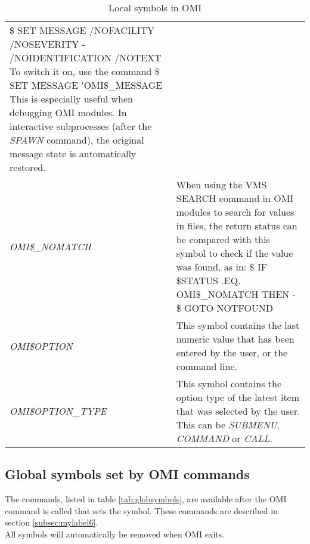 \documentclass[a4paper]{book}
\renewcommand{\indent}{\hspace*{5mm}}
\begin{document}
\begin{table}[ht]
\begin{minipage}[t]{\textwidth}
\begin{tabular}{lp{9cm}}
\indent\small{\textsf{{\$} SET MESSAGE /NOFACILITY /NOSEVERITY -}} \newline
\indent\indent\small{\textsf{/NOIDENTIFICATION /NOTEXT}} \newline
To switch it on, use the command \newline
\indent\small{\textsf{{\$} SET MESSAGE \'{}OMI{\$}{\_}MESSAGE}} \newline
This is especially useful when debugging OMI modules. In interactive subprocesses
(after the \textsl{SPAWN} command), the original message state is
automatically restored. \\
\textsl{OMI{\$}{\_}NOMATCH}\index{OMI{\$}{\_}NOMATCH}\index{OMI symbols!local symbols!OMI{\$}{\_}NOMATCH} & 
When using the VMS SEARCH command in OMI modules to search for 
values in files, the return status can be compared with this 
symbol to check if the value was found, as in: \linebreak
\indent\small{\textsf{{\$} IF {\$}STATUS .EQ. OMI{\$}{\_}NOMATCH THEN -}}\newline
\indent\indent\small{\textsf{{\$} GOTO NOTFOUND}}\\
\textsl{OMI{\$}OPTION}\index{OMI{\$}OPTION}\index{OMI symbols!local symbols!OMI{\$}OPTION} & 
This symbol contains the last numeric value that has been entered 
by the user, or the command line. \\
\textsl{OMI{\$}OPTION\_TYPE}\index{OMI{\$}OPTION\_TYPE}\index{OMI symbols!local symbols!OMI{\$}OPTION\_TYPE} & 
This symbol contains the option type of the latest item that was selected by
the user. This can be \textsl{SUBMENU}, \textsl{COMMAND} or \textsl{CALL}. \\
\hline
\end{tabular}
\caption{Local symbols in OMI}\label{tab:locsymbols}
\end{minipage}
\end{table}


\subsection{Global symbols set by OMI commands}
\label{subsubsec:global}

The commands, listed in table \ref{tab:globsymbols}, are available after the OMI command is 
called that sets the symbol. These commands are described in section \ref{subsec:mylabel6}. \\
All symbols will automatically be removed when OMI exits.
\end{document}

